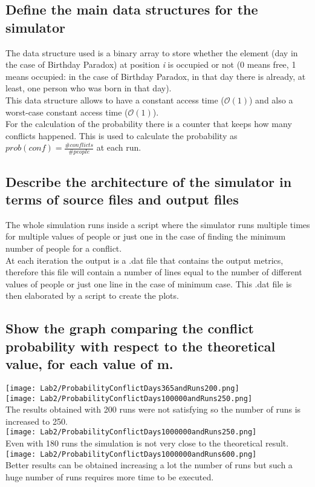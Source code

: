 \documentclass{report}
\begin{document}
{	\subsection{Define the main data structures for the simulator}
				The data structure used is a binary array to store whether the element (day in the case of Birthday Paradox) at position \emph{i} is occupied or not (0 means free, 1 means occupied: in the case of Birthday Paradox, in that day there is already, at least, one person who was born in that day). \\ This data structure allows to have a constant access time ($\mathcal{O}(1)$) and also a worst-case constant access time ($\mathcal{O}(1)$). \\
				For the calculation of the probability there is a counter that keeps how many conflicts happened. This is used to calculate the probability as $prob(conf)=\frac{\#conflicts}{\#people}$ at each run. \\
			
	\subsection{Describe the architecture of the simulator in terms of source files and output files}
			The whole simulation runs inside a script where the simulator runs multiple times for multiple values of people or just one in the case of finding the minimum number of people for a conflict. \\
			At each iteration the output is a .dat file that contains the output metrics, therefore this file will contain a number of lines equal to the number of different values of people or just one line in the case of minimum case. This .dat file is then elaborated by a script to create the plots.
		
		\subsection{Show the graph comparing the conflict probability with respect to the theoretical value,
for each value of m.}
				\texttt{[image: Lab2/ProbabilityConflictDays365andRuns200.png]} \\
				\texttt{[image: Lab2/ProbabilityConflictDays100000andRuns250.png]} \\
				The results obtained with 200 runs were not satisfying so the number of runs is increased to 250. \\
				\texttt{[image: Lab2/ProbabilityConflictDays1000000andRuns250.png]} \\
				Even with 180 runs the simulation is not very close to the theoretical result. \\
				\texttt{[image: Lab2/ProbabilityConflictDays1000000andRuns600.png]} \\
				Better results can be obtained increasing a lot the number of runs but such a huge number of runs requires more time to be executed.
				
}
\end{document}
